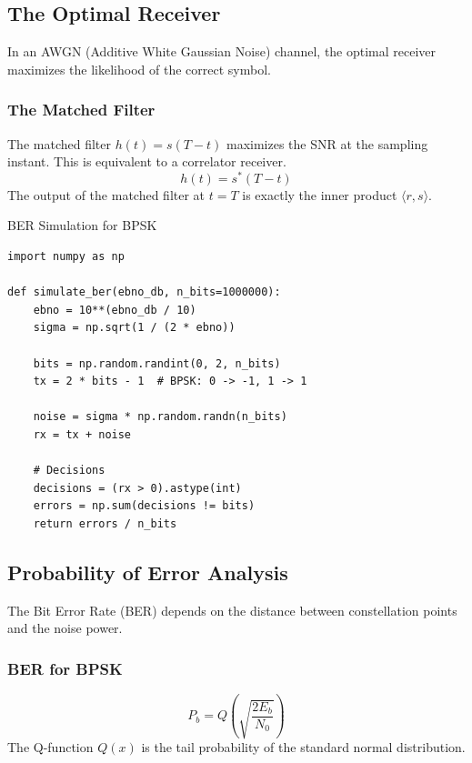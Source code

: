 
\subsection{The Optimal Receiver}
In an AWGN (Additive White Gaussian Noise) channel, the optimal receiver maximizes the likelihood of the correct symbol.

\subsubsection{The Matched Filter}
The matched filter $h(t) = s(T-t)$ maximizes the SNR at the sampling instant. This is equivalent to a correlator receiver.
\begin{equation}
    h(t) = s^*(T-t)
\end{equation}
The output of the matched filter at $t=T$ is exactly the inner product $\langle r, s \rangle$.

\begin{pythonbox}{BER Simulation for BPSK}
\begin{verbatim}
import numpy as np

def simulate_ber(ebno_db, n_bits=1000000):
    ebno = 10**(ebno_db / 10)
    sigma = np.sqrt(1 / (2 * ebno))
    
    bits = np.random.randint(0, 2, n_bits)
    tx = 2 * bits - 1  # BPSK: 0 -> -1, 1 -> 1
    
    noise = sigma * np.random.randn(n_bits)
    rx = tx + noise
    
    # Decisions
    decisions = (rx > 0).astype(int)
    errors = np.sum(decisions != bits)
    return errors / n_bits
\end{verbatim}
\end{pythonbox}

\subsection{Probability of Error Analysis}
The Bit Error Rate (BER) depends on the distance between constellation points and the noise power.

\subsubsection{BER for BPSK}
\begin{equation}
    P_b = Q\left(\sqrt{\frac{2E_b}{N_0}}\right)
\end{equation}
The Q-function $Q(x)$ is the tail probability of the standard normal distribution.

